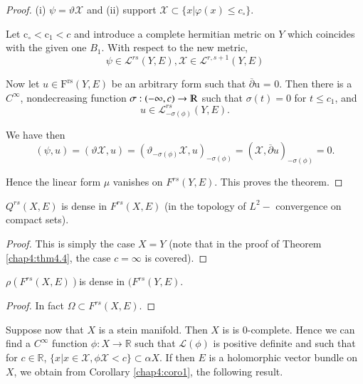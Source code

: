 \begin{proof}
(i) $\psi = \vartheta \mathcal{X}$ and \quad (ii) support $\mathcal{X}
\subset \big\{ x| \varphi (x) \leqslant c_\circ \big\}$. 

Let $\text{c}_\circ < \text{c}_{1} <c$ and introduce a complete
hermitian metric on $Y$ which coincides with the given one
$B_{1}$. With respect to the new metric, 
$$
\psi \in  \mathscr{L}^{rs} (Y,E), \mathcal{X} \in
\mathscr{L}^{r, s+1} (Y,E)
$$

Now let  $u \in \text{F}^\text{rs}(Y,E)$ be an arbitrary form such
that $\overline{\partial}\text{u = 0}$. Then there is a
$C^\infty$, nondecreasing function $\sigma : (- \infty,
c) \rightarrow \varmathbb{R}$ such that $\sigma(t) = 0$ 
for $t \leqslant c_1$, and 
$$
u \in \mathscr{L}_{- \sigma(\phi)}^{rs} (Y,E).
$$

We have then 
$$ 
(\psi, u) =(\vartheta \mathcal{X}, u) = (\vartheta_{- \sigma(\phi)}
\mathcal{X}, u)_{-\sigma(\phi)} = (\mathcal{X}, 
\overline{\partial} u)_{-\sigma (\phi)}=0.
$$

Hence the linear form $\mu$ vanishes on $F^{rs}(Y,E)$. This proves
the theorem.  
\end{proof}

\setcounter{corollary}{0}
\begin{corollary}\label{chap4:coro1}%
  $Q^{rs} (X,E)$ is dense in $F^{rs} (X,E)$ (in the topology of
  $L^2-$ convergence on compact sets). 
\end{corollary}

\begin{proof}
  This is simply the case $X=Y$ (note that in the proof of  Theorem
  \ref{chap4:thm4.4},   the case $c = \infty$ is covered).  
\end{proof}

\begin{corollary}\label{chap4:coro2}%
  $\rho(F^{rs} (X,E))$\pageoriginale is dense in $(F^{rs} (Y,E)$. 
\end{corollary}

\begin{proof}
  In fact $\Omega \subset F^{rs} (X,E)$. 
\end{proof}

Suppose now that $X$ is a stein manifold. Then $X$ is is 0-complete. Hence
we can find a $C^\infty$ function $\phi: X \rightarrow
\mathbb{R}$ such that $\mathscr{L}(\phi)$ is positive definite and
such that for $c \in \mathbb{R}$, $\big \{x| x \in
\mathcal{X}, \phi \mathcal{X} <  c \big\}\subset\alpha X$. 
If then $E$ is a holomorphic vector bundle on $X$, we obtain from
Corollary \ref{chap4:coro1}, the following result. 

